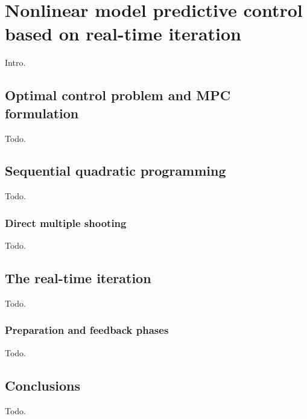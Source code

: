 \chapter{Nonlinear model predictive control based on real-time iteration}
Intro.

\section{Optimal control problem and MPC formulation}
Todo.

\section{Sequential quadratic programming}
Todo.

\subsection{Direct multiple shooting}
Todo.

\section{The real-time iteration}
Todo.

\subsection{Preparation and feedback phases}
Todo.

\section{Conclusions}
Todo.